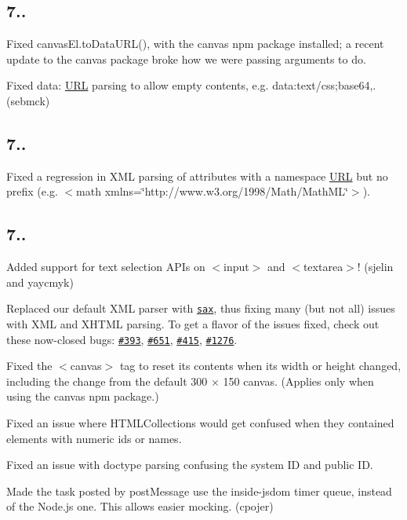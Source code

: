 \subsection*{7..}


\begin{DoxyItemize}
\item Fixed {\ttfamily canvas\+El.\+to\+Data\+U\+R\+L()}, with the {\ttfamily canvas} npm package installed; a recent update to the {\ttfamily canvas} package broke how we were passing arguments to do.
\item Fixed {\ttfamily data\+:} \mbox{\hyperlink{namespace_u_r_l}{U\+RL}} parsing to allow empty contents, e.\+g. {\ttfamily data\+:text/css;base64,}. (sebmck)
\end{DoxyItemize}

\subsection*{7..}


\begin{DoxyItemize}
\item Fixed a regression in X\+ML parsing of attributes with a namespace \mbox{\hyperlink{namespace_u_r_l}{U\+RL}} but no prefix (e.\+g. {\ttfamily $<$math xmlns=\char`\"{}http\+://www.\+w3.\+org/1998/\+Math/\+Math\+M\+L\char`\"{}$>$}).
\end{DoxyItemize}

\subsection*{7..}


\begin{DoxyItemize}
\item Added support for text selection A\+P\+Is on {\ttfamily $<$input$>$} and {\ttfamily $<$textarea$>$}! (sjelin and yaycmyk)
\item Replaced our default X\+ML parser with \href{https://www.npmjs.com/package/sax}{\tt sax}, thus fixing many (but not all) issues with X\+ML and X\+H\+T\+ML parsing. To get a flavor of the issues fixed, check out these now-\/closed bugs\+: \href{https://github.com/tmpvar/jsdom/issues/393}{\tt \#393}, \href{https://github.com/tmpvar/jsdom/issues/651}{\tt \#651}, \href{https://github.com/tmpvar/jsdom/issues/415}{\tt \#415}, \href{https://github.com/tmpvar/jsdom/issues/1276}{\tt \#1276}.
\item Fixed the {\ttfamily $<$canvas$>$} tag to reset its contents when its width or height changed, including the change from the default 300 × 150 canvas. (Applies only when using the {\ttfamily canvas} npm package.)
\item Fixed an issue where {\ttfamily H\+T\+M\+L\+Collection}s would get confused when they contained elements with numeric {\ttfamily id}s or {\ttfamily name}s.
\item Fixed an issue with doctype parsing confusing the system ID and public ID.
\item Made the task posted by {\ttfamily post\+Message} use the inside-\/jsdom timer queue, instead of the Node.\+js one. This allows easier mocking. (cpojer)
\end{DoxyItemize}

